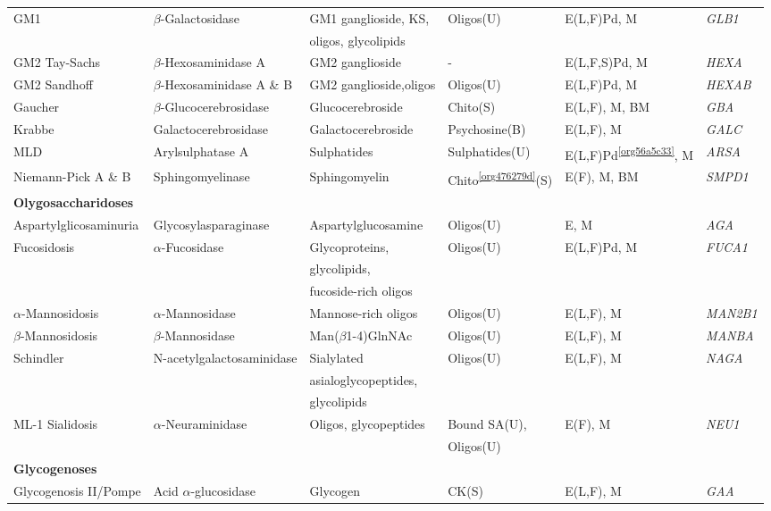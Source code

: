 \documentclass[landscape]{article}
\begin{document}
\begin{longtable}{llllll}
GM1 & \(\beta\)-Galactosidase & GM1 ganglioside, KS, & Oligos(U) & E(L,F)Pd, M & \emph{GLB1}\\
 &  & oligos, glycolipids &  &  & \\
GM2 Tay-Sachs & \(\beta\)-Hexosaminidase A & GM2 ganglioside & - & E(L,F,S)Pd, M & \emph{HEXA}\\
GM2 Sandhoff & \(\beta\)-Hexosaminidase A \& B & GM2 ganglioside,oligos & Oligos(U) & E(L,F)Pd, M & \emph{HEXAB}\\
Gaucher & \(\beta\)-Glucocerebrosidase & Glucocerebroside & Chito\footnotemark(S) & E(L,F), M, BM & \emph{GBA}\\
Krabbe & Galactocerebrosidase & Galactocerebroside & Psychosine(B) & E(L,F), M & \emph{GALC}\\
MLD & Arylsulphatase A & Sulphatides & Sulphatides(U) & E(L,F)Pd\textsuperscript{\ref{org56a5c33}}, M & \emph{ARSA}\\
Niemann-Pick A \& B & Sphingomyelinase & Sphingomyelin & Chito\textsuperscript{\ref{org476279d}}(S) & E(F), M, BM & \emph{SMPD1}\\
\hline
\textbf{Olygosaccharidoses} &  &  &  &  & \\
Aspartylglicosaminuria & Glycosylasparaginase & Aspartylglucosamine & Oligos(U) & E, M & \emph{AGA}\\
Fucosidosis & \(\alpha\)-Fucosidase & Glycoproteins, & Oligos(U) & E(L,F)Pd, M & \emph{FUCA1}\\
 &  & glycolipids, &  &  & \\
 &  & fucoside-rich oligos &  &  & \\
\(\alpha\)-Mannosidosis & \(\alpha\)-Mannosidase & Mannose-rich oligos & Oligos(U) & E(L,F), M & \emph{MAN2B1}\\
\(\beta\)-Mannosidosis & \(\beta\)-Mannosidase & Man(\(\beta\)1-4)GlnNAc & Oligos(U) & E(L,F), M & \emph{MANBA}\\
Schindler & N-acetylgalactosaminidase & Sialylated & Oligos(U) & E(L,F), M & \emph{NAGA}\\
 &  & asialoglycopeptides, &  &  & \\
 &  & glycolipids &  &  & \\
ML-1 Sialidosis & \(\alpha\)-Neuraminidase & Oligos, glycopeptides & Bound SA(U), & E(F), M & \emph{NEU1}\\
 &  &  & Oligos(U) &  & \\
\hline
\textbf{Glycogenoses} &  &  &  &  & \\
Glycogenosis II/Pompe & Acid \(\alpha\)-glucosidase & Glycogen & CK(S) & E(L\footnotemark,F), M & \emph{GAA}\\

\end{longtable}
\end{document}

